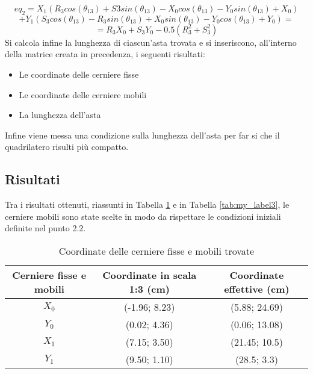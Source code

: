 \documentclass{article}
\begin{document}
\begin{equation*}
    eq_2 = X_1(R_3 cos(\theta_{13})+S3sin(\theta_{13})-X_0cos(\theta_{13})-Y_0sin(\theta_{13})+X_0)
\end{equation*}
\begin{equation}
    +Y_1(S_3cos(\theta_{13})-R_3sin(\theta_{13})+X_0sin(\theta_{13})-Y_0cos(\theta_{13})+Y_0)=
    \label{eqsuh2}
\end{equation}
\begin{equation*}
    =R_3X_0+S_3Y_0-0.5(R_3^2+S_3^2)
\end{equation*}
Si calcola infine la lunghezza di ciascun’asta trovata e si inseriscono, all’interno della matrice creata in precedenza, i seguenti risultati:
\begin{itemize}
    \item Le coordinate delle cerniere fisse
    \item Le coordinate delle cerniere mobili
    \item La lunghezza dell’asta
\end{itemize}

Infine viene messa una condizione sulla lunghezza dell’asta per far si che il quadrilatero risulti più compatto.

\subsection{Risultati}
Tra i risultati ottenuti, riassunti in Tabella \ref{tab:my_label2} e in Tabella \ref{tab:my_label3}, le cerniere mobili sono state scelte in modo da rispettare le condizioni iniziali definite nel punto 2.2.

\begin{table}[h!]
    \centering
    \begin{tabular}{c|c|c}
    \hline
         Cerniere fisse e mobili & Coordinate in scala 1:3 (cm) & Coordinate effettive (cm)\\
    \hline
         $X_0$ & (-1.96; 8.23) & (5.88; 24.69)\\
    \hline
         $Y_0$ & (0.02; 4.36) & (0.06; 13.08)\\
    \hline
         $X_1$ & (7.15; 3.50) & (21.45; 10.5)\\
    \hline
         $Y_1$ & (9.50; 1.10) & (28.5; 3.3)\\
    \hline
    \end{tabular}
    \caption{Coordinate delle cerniere fisse e mobili trovate}
    \label{tab:my_label2}
\end{table}
\end{document}
